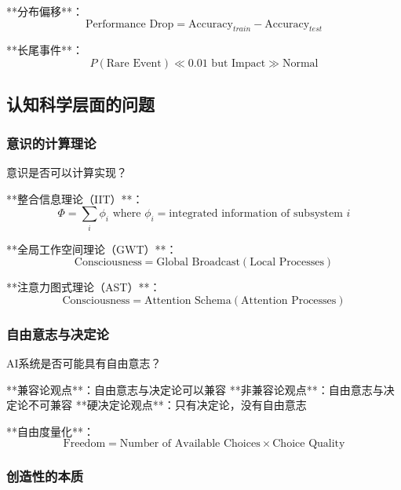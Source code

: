 **分布偏移**：
\begin{equation}
\text{Performance Drop} = \text{Accuracy}_{train} - \text{Accuracy}_{test}
\end{equation}

**长尾事件**：
\begin{equation}
P(\text{Rare Event}) \ll 0.01 \text{ but Impact} \gg \text{Normal}
\end{equation}

\subsection{认知科学层面的问题}

\subsubsection{意识的计算理论}

意识是否可以计算实现？

**整合信息理论（IIT）**：
\begin{equation}
\Phi = \sum_{i} \phi_i \text{ where } \phi_i = \text{integrated information of subsystem } i
\end{equation}

**全局工作空间理论（GWT）**：
\begin{equation}
\text{Consciousness} = \text{Global Broadcast}(\text{Local Processes})
\end{equation}

**注意力图式理论（AST）**：
\begin{equation}
\text{Consciousness} = \text{Attention Schema}(\text{Attention Processes})
\end{equation}

\subsubsection{自由意志与决定论}

AI系统是否可能具有自由意志？

**兼容论观点**：自由意志与决定论可以兼容
**非兼容论观点**：自由意志与决定论不可兼容
**硬决定论观点**：只有决定论，没有自由意志

**自由度量化**：
\begin{equation}
\text{Freedom} = \text{Number of Available Choices} \times \text{Choice Quality}
\end{equation}

\subsubsection{创造性的本质}

